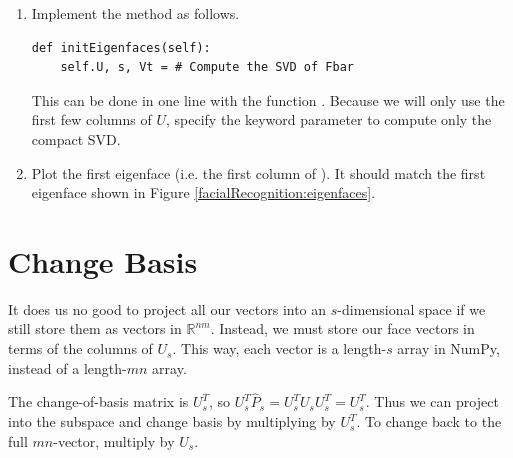 \begin{problem}
\label{prob:svd}
\leavevmode
\begin{enumerate}
\item Implement the method  as follows.
\begin{lstlisting}
def initEigenfaces(self):
    self.U, s, Vt = # Compute the SVD of Fbar
\end{lstlisting}
This can be done in one line with the function .
Because we will only use the first few columns of $U$, specify the keyword parameter  to compute only the compact SVD.
\item Plot the first eigenface (i.e. the first column of ).
It should match the first eigenface shown in Figure \ref{facialRecognition:eigenfaces}.
\end{enumerate}
\end{problem}

\section*{Change Basis}

It does us no good to project all our vectors into an $s$-dimensional space if we still store them as vectors in $\mathbb{R}^{nm}$. 
Instead, we must store our face vectors in terms of the columns of $U_s$.
This way, each vector is a length-$s$ array in NumPy, instead of a length-$mn$ array.

The change-of-basis matrix is $U_s^T$, so $U_s^T\widehat{P}_s = U_s^TU_sU_s^T = U_s^T$. 
Thus we can project into the subspace and change basis by multiplying by $U_s^T$.
To change back to the full $mn$-vector, multiply by $U_s$.


